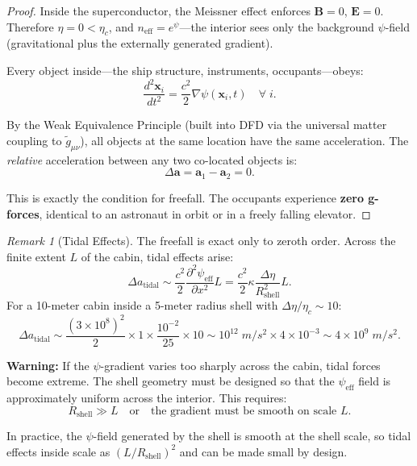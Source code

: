 \documentclass[12pt, letterpaper]{article}
\theoremstyle{definition}
\theoremstyle{remark}
\newtheorem{remark}{Remark}
\newcommand{\neff}{n_{\mathrm{eff}}}
\newcommand{\avec}{\mathbf{a}}
\newcommand{\etac}{\eta_c}
\begin{document}
\begin{proof}
Inside the superconductor, the Meissner effect enforces $\mathbf{B} = 0$,
$\mathbf{E} = 0$. Therefore $\eta = 0 < \etac$, and
$\neff = e^{\psi}$---the interior sees only the background $\psi$-field
(gravitational plus the externally generated gradient).

Every object inside---the ship structure, instruments, occupants---obeys:
\begin{equation}
\frac{d^2 \mathbf{x}_i}{dt^2} = \frac{c^2}{2} \nabla \psi(\mathbf{x}_i, t)
\quad \forall \; i.
\end{equation}

By the Weak Equivalence Principle (built into DFD via the universal matter
coupling to $\tilde{g}_{\mu\nu}$), all objects at the same location have the
same acceleration. The \emph{relative} acceleration between any two co-located
objects is:
\begin{equation}
\Delta \avec = \avec_1 - \avec_2 = 0.
\end{equation}

This is exactly the condition for freefall. The occupants experience
\textbf{zero g-forces}, identical to an astronaut in orbit or in a freely
falling elevator.
\end{proof}

\begin{remark}[Tidal Effects]
The freefall is exact only to zeroth order. Across the finite extent $L$ of
the cabin, tidal effects arise:
\begin{equation}
\Delta a_{\mathrm{tidal}} \sim \frac{c^2}{2} \frac{\partial^2 \psi_{\mathrm{eff}}}{\partial x^2} L
= \frac{c^2}{2} \kappa \frac{\Delta\eta}{R_{\mathrm{shell}}^2} L.
\end{equation}
For a 10-meter cabin inside a 5-meter radius shell with $\Delta\eta/\etac \sim 10$:
\begin{equation}
\Delta a_{\mathrm{tidal}} \sim \frac{(3 \times 10^8)^2}{2} \times 1 \times \frac{10^{-2}}{25} \times 10
\sim 10^{12} \; \si{m/s^2} \times 4 \times 10^{-3}
\sim 4 \times 10^{9} \; \si{m/s^2}.
\end{equation}

\textbf{Warning:} If the $\psi$-gradient varies too sharply across the cabin,
tidal forces become extreme. The shell geometry must be designed so that the
$\psi_{\mathrm{eff}}$ field is approximately uniform across the interior.
This requires:
\begin{equation}
R_{\mathrm{shell}} \gg L \quad \text{or} \quad
\text{the gradient must be smooth on scale } L.
\end{equation}

In practice, the $\psi$-field generated by the shell is smooth at the shell
scale, so tidal effects inside scale as $(L/R_{\mathrm{shell}})^2$ and can be
made small by design.
\end{remark}
\end{document}
